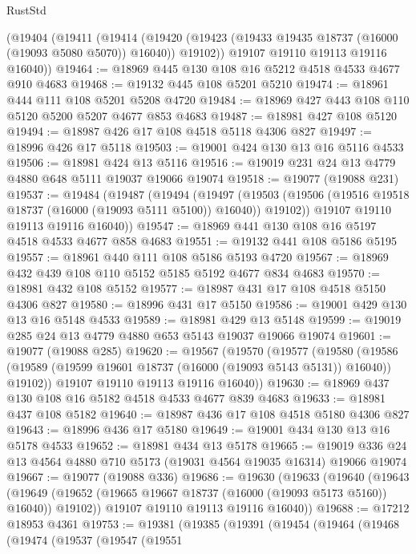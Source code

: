 \begin{lexlean}{RustStd}
\begin{coremodule}
    (@19404
      (@19411
        (@19414
          (@19420 (@19423 (@19433 @19435 @18737 (@16000 (@19093 @5080 @5070)) @16040)) @19102))
        @19107
        @19110
        @19113
        @19116
        @16040))
@19464 := @18969 @445 @130 @108 @16 @5212 @4518 @4533 @4677 @910 @4683
@19468 := @19132 @445 @108 @5201 @5210
@19474 := @18961 @444 @111 @108 @5201 @5208 @4720
@19484 := @18969 @427 @443 @108 @110 @5120 @5200 @5207 @4677 @853 @4683
@19487 := @18981 @427 @108 @5120
@19494 := @18987 @426 @17 @108 @4518 @5118 @4306 @827
@19497 := @18996 @426 @17 @5118
@19503 := @19001 @424 @130 @13 @16 @5116 @4533
@19506 := @18981 @424 @13 @5116
@19516 := @19019 @231 @24 @13 @4779 @4880 @648 @5111 @19037 @19066 @19074
@19518 := @19077 (@19088 @231)
@19537 := @19484
    (@19487
      (@19494
        (@19497
          (@19503 (@19506 (@19516 @19518 @18737 (@16000 (@19093 @5111 @5100)) @16040)) @19102))
        @19107
        @19110
        @19113
        @19116
        @16040))
@19547 := @18969 @441 @130 @108 @16 @5197 @4518 @4533 @4677 @858 @4683
@19551 := @19132 @441 @108 @5186 @5195
@19557 := @18961 @440 @111 @108 @5186 @5193 @4720
@19567 := @18969 @432 @439 @108 @110 @5152 @5185 @5192 @4677 @834 @4683
@19570 := @18981 @432 @108 @5152
@19577 := @18987 @431 @17 @108 @4518 @5150 @4306 @827
@19580 := @18996 @431 @17 @5150
@19586 := @19001 @429 @130 @13 @16 @5148 @4533
@19589 := @18981 @429 @13 @5148
@19599 := @19019 @285 @24 @13 @4779 @4880 @653 @5143 @19037 @19066 @19074
@19601 := @19077 (@19088 @285)
@19620 := @19567
    (@19570
      (@19577
        (@19580
          (@19586 (@19589 (@19599 @19601 @18737 (@16000 (@19093 @5143 @5131)) @16040)) @19102))
        @19107
        @19110
        @19113
        @19116
        @16040))
@19630 := @18969 @437 @130 @108 @16 @5182 @4518 @4533 @4677 @839 @4683
@19633 := @18981 @437 @108 @5182
@19640 := @18987 @436 @17 @108 @4518 @5180 @4306 @827
@19643 := @18996 @436 @17 @5180
@19649 := @19001 @434 @130 @13 @16 @5178 @4533
@19652 := @18981 @434 @13 @5178
@19665 := @19019 @336 @24 @13 @4564 @4880 @710 @5173 (@19031 @4564 @19035 @16314) @19066 @19074
@19667 := @19077 (@19088 @336)
@19686 := @19630
    (@19633
      (@19640
        (@19643
          (@19649 (@19652 (@19665 @19667 @18737 (@16000 (@19093 @5173 @5160)) @16040)) @19102))
        @19107
        @19110
        @19113
        @19116
        @16040))
@19688 := @17212 @18953 @4361
@19753 := @19381
    (@19385
      (@19391
        (@19454
          (@19464
            (@19468
              (@19474
                (@19537
                  (@19547
                    (@19551

\end{coremodule}
\end{lexlean}
